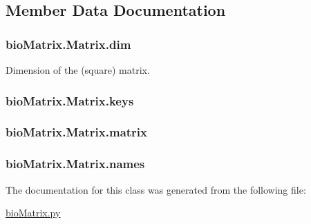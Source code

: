 \subsection{Member Data Documentation}
\hypertarget{classbio_matrix_1_1_matrix_afc9f87f991fe11b9f403d4d52dddfaf1}{
\subsubsection[{dim}]{\setlength{\rightskip}{0pt plus 5cm}bio\+Matrix.\+Matrix.\+dim}}\label{classbio_matrix_1_1_matrix_afc9f87f991fe11b9f403d4d52dddfaf1}


Dimension of the (square) matrix. 

\hypertarget{classbio_matrix_1_1_matrix_a3789a00fec34f4d47cf493c732f1e206}{
\subsubsection[{keys}]{\setlength{\rightskip}{0pt plus 5cm}bio\+Matrix.\+Matrix.\+keys}}\label{classbio_matrix_1_1_matrix_a3789a00fec34f4d47cf493c732f1e206}
\hypertarget{classbio_matrix_1_1_matrix_a235040cc306c1d399f143310f00cc3c1}{
\subsubsection[{matrix}]{\setlength{\rightskip}{0pt plus 5cm}bio\+Matrix.\+Matrix.\+matrix}}\label{classbio_matrix_1_1_matrix_a235040cc306c1d399f143310f00cc3c1}
\hypertarget{classbio_matrix_1_1_matrix_a56a6828c6db7753db8c46bb489f55b4d}{
\subsubsection[{names}]{\setlength{\rightskip}{0pt plus 5cm}bio\+Matrix.\+Matrix.\+names}}\label{classbio_matrix_1_1_matrix_a56a6828c6db7753db8c46bb489f55b4d}


The documentation for this class was generated from the following file\+:\begin{DoxyCompactItemize}
\item 
\hyperlink{bio_matrix_8py}{bio\+Matrix.\+py}\end{DoxyCompactItemize}
